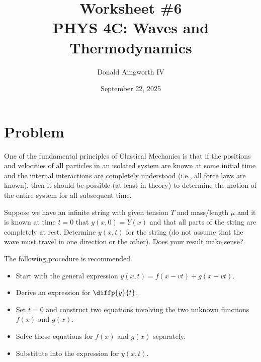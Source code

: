 \documentclass[12pt]{article}
\title{
    Worksheet \#6
    \\  \small
    PHYS 4C: Waves and Thermodynamics
    }
\author{Donald Aingworth IV}
\date{September 22, 2025}
\begin{document}

    \maketitle

    \setcounter{section}{1}
    \section*{Problem}
        One of the fundamental principles of Classical Mechanics is that if the positions and velocities of all particles in an isolated system are known at some initial time and the internal interactions are completely understood (i.e., all force laws are known), then it should be possible (at least in theory) to determine the motion of the entire system for all subsequent time.
        
        Suppose we have an infinite string with given tension $T$ and mass/length $\mu$ and it is known at time $t = 0$ that $y(x,0) = Y(x)$ and that all parts of the string are completely at rest. 
        Determine $y(x,t)$ for the string (do not assume that the wave must travel in one direction or the other). 
        Does your result make sense?
        
        The following procedure is recommended.
        \begin{itemize}
            \item   Start with the general expression $y(x,t) = f(x - vt) + g(x + vt)$.
            \item   Derive an expression for $\diffp{y}{t}$.
            \item   Set $t = 0$ and construct two equations involving the two unknown functions $f(x)$ and $g(x)$.
            \item   Solve those equations for $f(x)$ and $g(x)$ separately.
            \item   Substitute into the expression for $y(x,t)$.
        \end{itemize}
        
\end{document}

